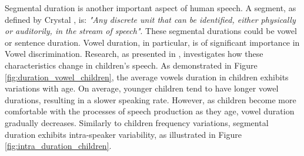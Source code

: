 
Segmental duration is another important aspect of human speech. A segment, as defined by Crystal \cite{segment_definition}, is: \textit{"Any discrete unit that can be identified, either physically or auditorily, in the stream of speech"}. These segmental durations could be vowel or sentence duration. Vowel duration, in particular, is of significant importance in Vowel discrimination. Research, as presented in \cite{Acoustic_change_children}, investigates how these characteristics change in children's speech. As demonstrated in Figure \ref{fig:duration_vowel_children}, the average vowels duration in children exhibits variations with age. On average, younger children tend to have longer vowel durations, resulting in a slower speaking rate. However, as children become more comfortable with the processes of speech production as they age, vowel duration gradually decreases. Similarly to children frequency variations, segmental duration exhibits intra-speaker variability, as illustrated in Figure \ref{fig:intra_duration_children}.


